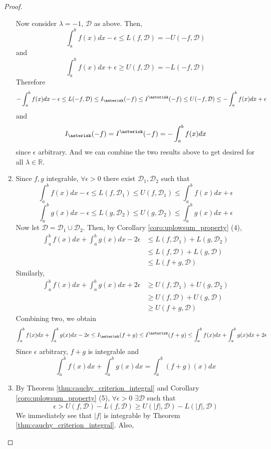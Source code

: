 \documentclass[10pt, a4paper, twoside]{report}
\begin{document}
\begin{proof}
\begin{enumerate}
        Now consider \(\lambda=-1\), \(\mathcal{D}\) as above. Then,
        \[\int_a^bf(x)dx-\epsilon\leq L(f,\mathcal{D})=-U(-f,\mathcal{D})\]
        and 
        \[\int_a^bf(x)dx+\epsilon\geq U(f,\mathcal{D})=-L(-f,\mathcal{D})\]
        Therefore 
        \[-\int_a^bf(x)dx-\epsilon\leq L(-f,\mathcal{D})\leq I_\asterisk(-f)\leq I^\asterisk(-f)\leq U(-f,\mathcal{D})\leq-\int_a^bf(x)dx+\epsilon\]
        and 
        \[I_\asterisk(-f)=I^\asterisk(-f)=-\int_a^bf(x)dx\]
        since \(\epsilon\) arbitrary. And we can combine the two results above to get desired for all \(\lambda\in\mathbb{R}\).
        \item Since \(f,g\) integrable, \(\forall\epsilon>0\) there exist \(\mathcal{D}_1,\mathcal{D}_2\) such that
        \[\int_a^bf(x)dx-\epsilon\leq L(f,\mathcal{D}_1)\leq U(f,\mathcal{D}_1)\leq\int_a^bf(x)dx+\epsilon\]
        \[\int_a^bg(x)dx-\epsilon\leq L(g,\mathcal{D}_2)\leq U(g,\mathcal{D}_2)\leq\int_a^bg(x)dx+\epsilon\]
        Now let \(\mathcal{D}=\mathcal{D}_1\cup\mathcal{D}_2\). Then, by Corollary \ref{coro:uplowsum_property} (4),
        \begin{align*}
            \int_a^bf(x)dx+\int_a^bg(x)dx-2\epsilon&\leq L(f,\mathcal{D}_1)+L(g,\mathcal{D}_2) \\
            &\leq L(f,\mathcal{D})+L(g,\mathcal{D}) \\
            &\leq L(f+g,\mathcal{D}) 
        \end{align*}
        Similarly,
        \begin{align*}
            \int_a^bf(x)dx+\int_a^bg(x)dx+2\epsilon&\geq U(f,\mathcal{D}_1)+U(g,\mathcal{D}_2) \\
            &\geq U(f,\mathcal{D})+U(g,\mathcal{D}) \\
            &\geq U(f+g,\mathcal{D}) 
        \end{align*}
        Combining two, we obtain 
        \[\int_a^bf(x)dx+\int_a^bg(x)dx-2\epsilon\leq I_\asterisk(f+g)\leq I^\asterisk(f+g)\leq\int_a^bf(x)dx+\int_a^bg(x)dx+2\epsilon\]
        Since \(\epsilon\) arbitrary, \(f+g\) is integrable and 
        \[\int_a^bf(x)dx+\int_a^bg(x)dx=\int_a^b(f+g)(x)dx\]
        \item By Theorem \ref{thm:cauchy_criterion_integral} and Corollary \ref{coro:uplowsum_property} (5), \(\forall\epsilon>0\) \(\exists\mathcal{D}\) such that 
        \[\epsilon>U(f,\mathcal{D})-L(f,\mathcal{D})\geq U(|f|,\mathcal{D})-L(|f|,\mathcal{D})\]
        We immediately see that \(|f|\) is integrable by Theorem \ref{thm:cauchy_criterion_integral}. Also, 

\end{enumerate}
\end{proof}
\end{document}
